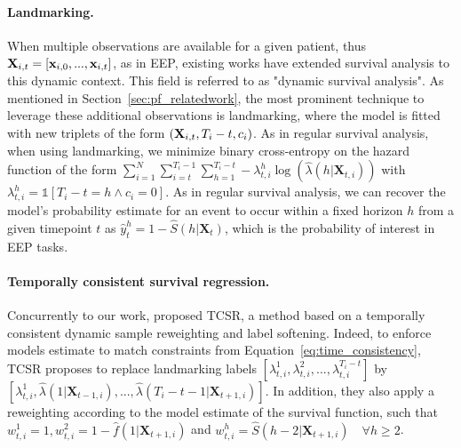 \documentclass[nohyperref]{article}
\begin{document}
\paragraph{Landmarking.} When multiple observations are available for a given patient, thus $\operatorname{\mathbf{X}}_{i,t} = [\mathbf{x}_{i,0}, ..., \mathbf{x}_{i,t}]$, as in EEP, existing works \cite{van2007dynamic,parast2014landmark} have extended survival analysis to this dynamic context. This field is referred to as "dynamic survival analysis". As mentioned in Section~\ref{sec:pf_relatedwork}, the most prominent technique to leverage these additional observations is landmarking, where the model is fitted with new triplets of the form $(\operatorname{\mathbf{X}}_{i,t}, T_i - t, c_i)$. As in regular survival analysis, when using landmarking, we minimize binary cross-entropy on the hazard function of the form   $ \sum^N_{i=1} \sum^{T_i-1}_{i=t}  \sum^{T_i- t}_{h=1} - \lambda^h_{t,i}\log(\hat{\lambda}(h|\mathbf{X}_{t,i}))$ with  $\lambda^h_{t,i} = \mathds{1}\left[T_i - t = h \land c_i=0\right]$.
As in regular survival analysis, we can recover the model's probability estimate for an event to occur within a fixed horizon $h$ from a given timepoint $t$ as $\hat{y}^h_t = 1-\hat{S}(h|\mathbf{X}_t)$, which is the probability of interest in EEP tasks.


\paragraph{Temporally consistent survival regression.} Concurrently to our work, \citet{Maystre2022} proposed TCSR, a method based on a temporally consistent dynamic sample reweighting  and label softening. Indeed, to enforce models estimate to match constraints from Equation~\ref{eq:time_consistency}, TCSR proposes to replace landmarking labels $[\lambda^1_{t,i}, \lambda^2_{t,i}, ..., \lambda^{T_i-t}_{t,i}]$ by $[\lambda^1_{t,i}, \hat{\lambda}(1|\mathbf{X}_{t-1,i}), ..., \hat{\lambda}(T_i - t - 1|\mathbf{X}_{t+1,i})]$. In addition, they also apply a reweighting according to the model estimate of the survival function, such that $ w^1_{t,i} = 1, w^2_{t,i} = 1- \hat{f}(1|\mathbf{X}_{t+1,i})$ and $w^h_{t,i} = \hat{S}(h-2|\mathbf{X}_{t+1,i}) \quad \forall h \geq 2$. 
\end{document}
